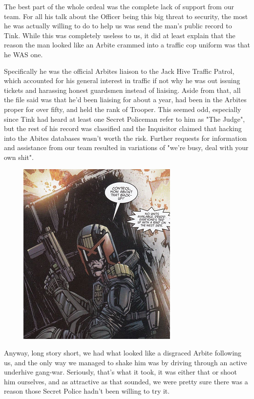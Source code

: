 The best part of the whole ordeal was the complete lack of support from our team. 
For all his talk about the Officer being this big threat to security, the most he was actually willing to do to help us was send the man's public record to Tink. 
While this was completely useless to us, it did at least explain that the reason the man looked like an Arbite crammed into a traffic cop uniform was that he WAS one. 


Specifically he was the official Arbites liaison to the Jack Hive Traffic Patrol, which accounted for his general interest in traffic if not why he was out issuing tickets and harassing honest guardsmen instead of liaising. 
Aside from that, all the file said was that he'd been liaising for about a year, had been in the Arbites proper for over fifty, and held the rank of Trooper. 
This seemed odd, especially since Tink had heard at least one Secret Policeman refer to him as "The Judge", but the rest of his record was classified and the Inquisitor claimed that hacking into the Abites databases wasn't worth the risk. 
Further requests for information and assistance from our team resulted in variations of "we're busy, deal with your own shit".

\begin{figure}
	\begin{center}
		\includegraphics[width=\figwidth]{pics/17/56.png}
	\end{center}
\end{figure}
Anyway, long story short, we had what looked like a disgraced Arbite following us, and the only way we managed to shake him was by driving through an active underhive gang-war. 
Seriously, that's what it took, it was either that or shoot him ourselves, and as attractive as that sounded, we were pretty sure there was a reason those Secret Police hadn't been willing to try it.

